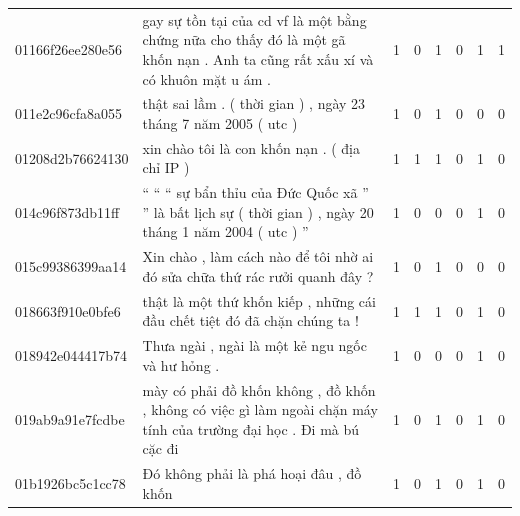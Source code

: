 \begin{table}[htb!]
{\begin{minipage}{0.88\textheight}
\begin{threeparttable}
\begin{tabularx}{\textwidth}{L{0.95} L{6.25} C{0.135} C{0.135} C{0.135} C{0.135} C{0.135} C{0.135}}
                    01166f26ee280e56 & gay sự tồn tại của cd vf là một bằng chứng nữa cho thấy đó là một gã khốn nạn . Anh ta cũng rất xấu xí và có khuôn mặt u ám .     & 1           & 0           & 1           & 0           & 1           & 1           \\
                    011e2c96cfa8a055 & thật sai lầm . ( thời gian ) , ngày 23 tháng 7 năm 2005 ( utc )                                                                   & 1           & 0           & 1           & 0           & 0           & 0           \\
                    01208d2b76624130 & xin chào tôi là con khốn nạn . ( địa chỉ IP )                                                                                     & 1           & 1           & 1           & 0           & 1           & 0           \\
                    014c96f873db11ff & `` `` `` sự bẩn thỉu của Đức Quốc xã '' '' là bất lịch sự ( thời gian ) , ngày 20 tháng 1 năm 2004 ( utc ) ''                     & 1           & 0           & 0           & 0           & 1           & 0           \\
                    015c99386399aa14 & Xin chào , làm cách nào để tôi nhờ ai đó sửa chữa thứ rác rưởi quanh đây ?                                                        & 1           & 0           & 1           & 0           & 0           & 0           \\
                    018663f910e0bfe6 & thật là một thứ khốn kiếp , những cái đầu chết tiệt đó đã chặn chúng ta !                                                         & 1           & 1           & 1           & 0           & 1           & 0           \\
                    018942e044417b74 & Thưa ngài , ngài là một kẻ ngu ngốc và hư hỏng .                                                                                  & 1           & 0           & 0           & 0           & 1           & 0           \\
                    019ab9a91e7fcdbe & mày có phải đồ khốn không , đồ khốn , không có việc gì làm ngoài chặn máy tính của trường đại học . Đi mà bú cặc đi               & 1           & 0           & 1           & 0           & 1           & 0           \\
                    01b1926bc5c1cc78 & Đó không phải là phá hoại đâu , đồ khốn                                                                                           & 1           & 0           & 1           & 0           & 1           & 0           \\

\end{tabularx}
\end{threeparttable}
\end{minipage}}
\end{table}
